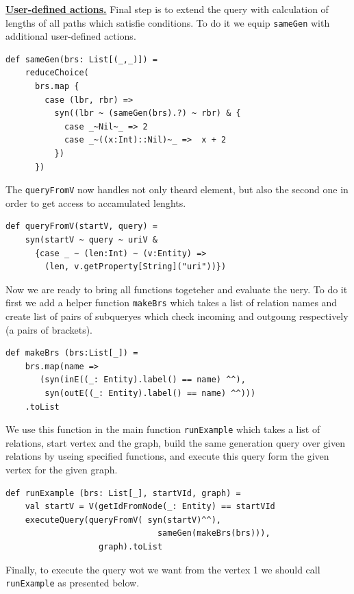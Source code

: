 \underline{\textbf{User-defined actions.}}
Final step is to extend the query with calculation of lengths of all paths which satisfie conditions.
To do it we equip \verb|sameGen| with additional user-defined actions.

\begin{lstlisting}
def sameGen(brs: List[(_,_)]) =
    reduceChoice(
      brs.map {
        case (lbr, rbr) =>
          syn((lbr ~ (sameGen(brs).?) ~ rbr) & {
            case _~Nil~_ => 2
            case _~((x:Int)::Nil)~_ =>  x + 2
          })
      })
\end{lstlisting}

The \verb|queryFromV| now handles not only theard element, but also the second one in order to get access to accamulated lenghts.

\begin{lstlisting}
def queryFromV(startV, query) =
    syn(startV ~ query ~ uriV &
      {case _ ~ (len:Int) ~ (v:Entity) =>
        (len, v.getProperty[String]("uri"))})
\end{lstlisting}

Now we are ready to bring all functions togeteher and evaluate the uery.
To do it first we add a helper function \verb|makeBrs| which takes a list of relation names and create list of pairs of subqueryes which check incoming and outgoung respectively (a pairs of brackets). 

\begin{lstlisting}
def makeBrs (brs:List[_]) =
    brs.map(name =>
       (syn(inE((_: Entity).label() == name) ^^),
        syn(outE((_: Entity).label() == name) ^^)))
    .toList
\end{lstlisting}

We use this function in the main function \verb|runExample| which takes a list of relations, start vertex and the graph, build the same generation query over given relations by useing specified functions, and execute this query form the given vertex for the given graph.

\begin{lstlisting}
def runExample (brs: List[_], startVId, graph) =
    val startV = V(getIdFromNode(_: Entity) == startVId
    executeQuery(queryFromV( syn(startV)^^),
                               sameGen(makeBrs(brs))),
                   graph).toList
\end{lstlisting}

Finally, to execute the query wot we want from the vertex 1 we should call \verb|runExample| as presented below.

